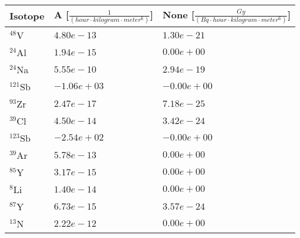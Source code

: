 \begin{tabular}{lll}
\hline
 Isotope    & A [$\frac{1}{\left(hour \cdot kilogram \cdot meter^{6}\right)}$]   & None [$\frac{Gy}{\left(Bq \cdot hour \cdot kilogram \cdot meter^{6}\right)}$]   \\
\hline
 $^{48}$V   & $4.80e-13 $                                                        & $1.30e-21 $                                                                     \\
 $^{24}$Al  & $1.94e-15 $                                                        & $0.00e+00 $                                                                     \\
 $^{24}$Na  & $5.55e-10 $                                                        & $2.94e-19 $                                                                     \\
 $^{121}$Sb & $-1.06e+03 $                                                       & $-0.00e+00 $                                                                    \\
 $^{93}$Zr  & $2.47e-17 $                                                        & $7.18e-25 $                                                                     \\
 $^{39}$Cl  & $4.50e-14 $                                                        & $3.42e-24 $                                                                     \\
 $^{123}$Sb & $-2.54e+02 $                                                       & $-0.00e+00 $                                                                    \\
 $^{39}$Ar  & $5.78e-13 $                                                        & $0.00e+00 $                                                                     \\
 $^{85}$Y   & $3.17e-15 $                                                        & $0.00e+00 $                                                                     \\
 $^{8}$Li   & $1.40e-14 $                                                        & $0.00e+00 $                                                                     \\
 $^{87}$Y   & $6.73e-15 $                                                        & $3.57e-24 $                                                                     \\
 $^{13}$N   & $2.22e-12 $                                                        & $0.00e+00 $                                                                     \\

\end{tabular}
